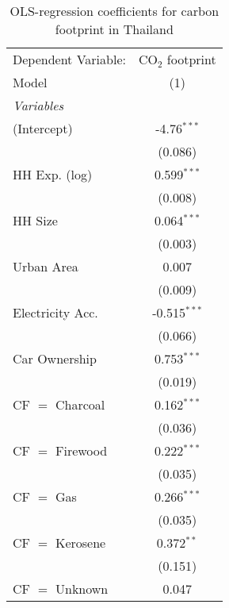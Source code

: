 
\begin{table}[htbp!]
   \centering
   \small
   \begin{adjustbox}{width = 1\textwidth, max height = 0.95\textheight, center}
      \begin{threeparttable}[b]
         \caption{\label{tab:OLS_2_THA} OLS-regression coefficients for carbon footprint in Thailand}
         \begin{tabular}{lc}
            \tabularnewline \midrule \midrule
            Dependent Variable: & CO$_{2}$ footprint\\  
            Model               & (1)\\  
            \midrule
            \emph{Variables}\\
            (Intercept)         & -4.76$^{***}$\\   
                                & (0.086)\\   
            HH Exp. (log)       & 0.599$^{***}$\\   
                                & (0.008)\\   
            HH Size             & 0.064$^{***}$\\   
                                & (0.003)\\   
            Urban Area          & 0.007\\   
                                & (0.009)\\   
            Electricity Acc.    & -0.515$^{***}$\\   
                                & (0.066)\\   
            Car Ownership       & 0.753$^{***}$\\   
                                & (0.019)\\   
            CF $=$ Charcoal     & 0.162$^{***}$\\   
                                & (0.036)\\   
            CF $=$ Firewood     & 0.222$^{***}$\\   
                                & (0.035)\\   
            CF $=$ Gas          & 0.266$^{***}$\\   
                                & (0.035)\\   
            CF $=$ Kerosene     & 0.372$^{**}$\\   
                                & (0.151)\\   
            CF $=$ Unknown      & 0.047\\   

\end{tabular}
\end{threeparttable}
\end{adjustbox}
\end{table}
